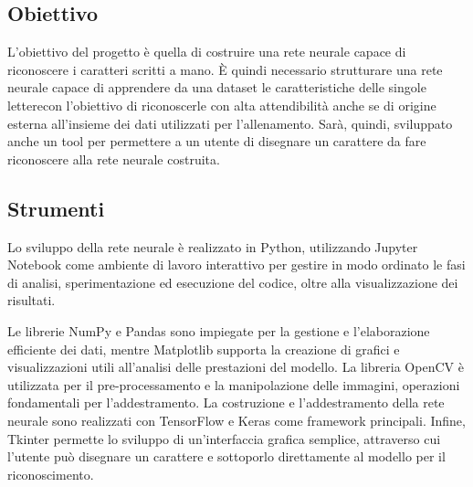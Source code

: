 \documentclass[a4paper,12pt]{article}
\begin{document}
\subsection{Obiettivo}
L'obiettivo del progetto è quella di costruire una rete neurale capace di riconoscere i caratteri scritti a mano.
È quindi necessario strutturare una rete neurale capace di apprendere da una dataset le caratteristiche delle singole letterecon l'obiettivo di riconoscerle con alta attendibilità anche se di origine esterna all'insieme dei dati utilizzati per l'allenamento.
Sarà, quindi, sviluppato anche un tool per permettere a un utente di disegnare un carattere da fare riconoscere alla rete neurale costruita.

\subsection{Strumenti}
Lo sviluppo della rete neurale è realizzato in Python, utilizzando Jupyter Notebook come ambiente di lavoro interattivo per gestire in modo ordinato le fasi di analisi, sperimentazione ed esecuzione del codice, oltre alla visualizzazione dei risultati.

Le librerie NumPy e Pandas sono impiegate per la gestione e l'elaborazione efficiente dei dati, mentre Matplotlib supporta la creazione di grafici e visualizzazioni utili all'analisi delle prestazioni del modello.
La libreria OpenCV è utilizzata per il pre-processamento e la manipolazione delle immagini, operazioni fondamentali per l'addestramento.
La costruzione e l'addestramento della rete neurale sono realizzati con TensorFlow e Keras come framework principali. Infine, Tkinter permette lo sviluppo di un'interfaccia grafica semplice, attraverso cui l'utente può disegnare un carattere e sottoporlo direttamente al modello per il riconoscimento.
\end{document}
